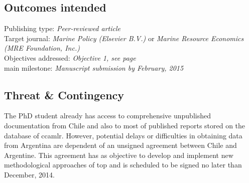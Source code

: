 \subsection*{Outcomes intended}

Publishing type: \textit{Peer-reviewed article} \\
Target journal: \textit{Marine Policy (Elsevier B.V.)} or \textit{Marine Resource Economics (MRE Foundation, Inc.)} \\
Objectives addressed: \textit{Objective 1, see page~\pageref{subsec:objetives} }\\
main milestone: \textit{Manuscript submission by February,  2015}


\subsection*{Threat \& Contingency}
\label{subsec:tconti}

The PhD student already has access to comprehensive unpublished documentation from Chile and also to most of published reports stored on the database of \ac{ccamlr}. However, potential delays or difficulties in obtaining data from Argentina are dependent of an unsigned agreement between Chile and Argentine. This agreement has as objective to develop and implement new methodological approaches of \acl{top} and is scheduled  to be signed no later than December, 2014. 

\vspace{2.5cm}
